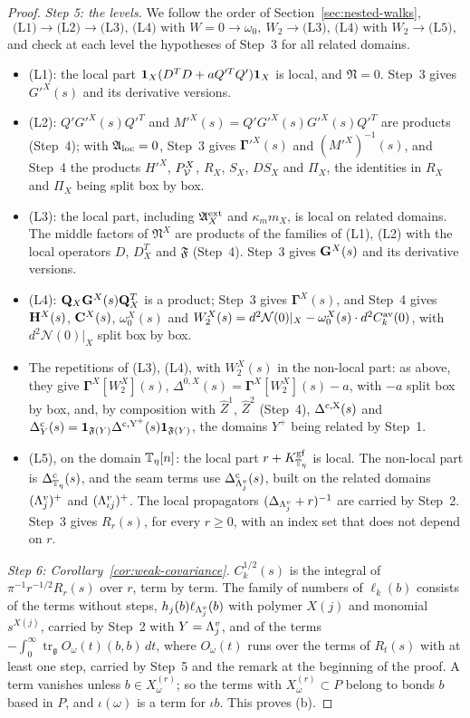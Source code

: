 \begin{proof}
\emph{Step 5: the levels.} We follow the order of Section~\ref{sec:nested-walks},
\[
\text{(L1)}\to\text{(L2)}\to\text{(L3), (L4) with }W=0\to\omega_0,\ W_2\to\text{(L3), (L4) with }W_2\to\text{(L5)},
\]
and check at each level the hypotheses of Step~3 for all related domains.
\begin{itemize}
\item (L1): the local part $\mathbf 1_X(D^TD+aQ'^TQ')\mathbf 1_X$ is local, and $\mathfrak N=0$. Step~3 gives $G'^X(s)$ and its derivative versions.
\item (L2): $Q'G'^X(s)Q'^T$ and $M'^X(s)=Q'G'^X(s)G'^X(s)Q'^T$ are products (Step~4); with $\mathfrak A_{\rm loc}=0$, Step~3 gives $\boldsymbol\Gamma'^X(s)$ and $(M'^X)^{-1}(s)$, and Step~4 the products $H'^X$, $P^X_\mathcal V$, $R_X$, $S_X$, $DS_X$ and $\Pi_X$, the identities in $R_X$ and $\Pi_X$ being split box by box.
\item (L3): the local part, including $\mathfrak A^{\rm ext}_X$ and $\kappa_mm_X$, is local on related domains. The middle factors of $\mathfrak N^X$ are products of the families of (L1), (L2) with the local operators $D$, $D^T_X$ and $\mathfrak F$ (Step~4). Step~3 gives $\mathbf G^X(s)$ and its derivative versions.
\item (L4): $\mathbf Q_X\mathbf G^X(s)\mathbf Q_X^T$ is a product; Step~3 gives $\boldsymbol\Gamma^X(s)$, and Step~4 gives $\mathbf H^X(s)$, $\mathbf C^X(s)$, $\omega_0^X(s)$ and $W_2^X(s)=d^2\mathcal N(0)|_X-\omega_0^X(s)\cdot d^2C^{\rm av}_k(0)$, with $d^2\mathcal N(0)|_X$ split box by box.
\item The repetitions of (L3), (L4), with $W_2^X(s)$ in the non-local part: as above, they give $\boldsymbol\Gamma^X[W_2^X](s)$, $\Delta^{0,X}(s)=\boldsymbol\Gamma^X[W_2^X](s)-a$, with $-a$ split box by box, and, by composition with $\hat Z^1$, $\hat Z^2$ (Step~4), $\Delta^{\rm c,X}(s)$ and $\Delta^{\rm c}_Y(s)=\mathbf 1_{\mathfrak F(Y)}\Delta^{\rm c,Y^+}(s)\mathbf 1_{\mathfrak F(Y)}$, the domains $Y^+$ being related by Step~1.
\item (L5), on the domain $\mathbb T_\eta[n]$: the local part $r+K^{\rm gf}_{\mathbb T_\eta}$ is local. The non-local part is $\Delta^{\rm c}_{\mathbb T_\eta}(s)$, and the seam terms use $\Delta^{\rm c}_{\Lambda^v_j}(s)$, built on the related domains $(\Lambda^v_j)^+$ and $(\Lambda^v_{\iota j})^+$. The local propagators $(\Delta_{\Lambda^v_j}+r)^{-1}$ are carried by Step~2. Step~3 gives $R_r(s)$, for every $r\ge0$, with an index set that does not depend on $r$.
\end{itemize}

\emph{Step 6: Corollary~\ref{cor:weak-covariance}.} $C_k^{1/2}(s)$ is the integral of $\pi^{-1}r^{-1/2}R_r(s)$ over $r$, term by term. The family of numbers of $\ell_k(b)$ consists of the terms without steps, $h_j(b)\ell_{\Lambda^v_j}(b)$ with polymer $X(j)$ and monomial $s^{X(j)}$, carried by Step~2 with $Y=\Lambda^v_j$, and of the terms $-\int_0^\infty\operatorname{tr}_{\mathfrak g}O_\omega(t)(b,b)\,dt$, where $O_\omega(t)$ runs over the terms of $R_t(s)$ with at least one step, carried by Step~5 and the remark at the beginning of the proof. A term vanishes unless $b\in X_\omega^{(r)}$; so the terms with $X_\omega^{(r)}\subset P$ belong to bonds $b$ based in $P$, and $\iota(\omega)$ is a term for $\iota b$. This proves (b).


\end{proof}
